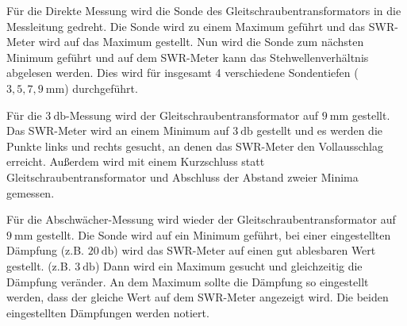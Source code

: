 Für die Direkte Messung wird die Sonde des Gleitschraubentransformators in die Messleitung gedreht.
Die Sonde wird zu einem Maximum geführt und das SWR-Meter wird auf das Maximum gestellt.
Nun wird die Sonde zum nächsten Minimum geführt und auf dem SWR-Meter kann das Stehwellenverhältnis abgelesen werden.
Dies wird für insgesamt 4 verschiedene Sondentiefen ($3,5,7,\SI{9}{\milli\meter}$) durchgeführt.

Für die $\SI{3}{\decibel}$-Messung wird der Gleitschraubentransformator auf $\SI{9}{\milli\meter}$ gestellt.
Das SWR-Meter wird an einem Minimum auf $\SI{3}{\decibel}$ gestellt
und es werden die Punkte links und rechts gesucht, an denen das SWR-Meter den Vollausschlag erreicht.
Außerdem wird mit einem Kurzschluss statt Gleitschraubentransformator und Abschluss der Abstand zweier Minima gemessen.

Für die Abschwächer-Messung wird wieder der Gleitschraubentransformator auf $\SI{9}{\milli\meter}$ gestellt.
Die Sonde wird auf ein Minimum geführt,
bei einer eingestellten Dämpfung (z.B. $\SI{20}{\decibel}$) wird das SWR-Meter auf einen gut ablesbaren Wert gestellt. (z.B. $\SI{3}{\decibel}$)
Dann wird ein Maximum gesucht und gleichzeitig die Dämpfung veränder. 
An dem Maximum sollte die Dämpfung so eingestellt werden, dass der gleiche Wert auf dem SWR-Meter angezeigt wird.
Die beiden eingestellten Dämpfungen werden notiert.